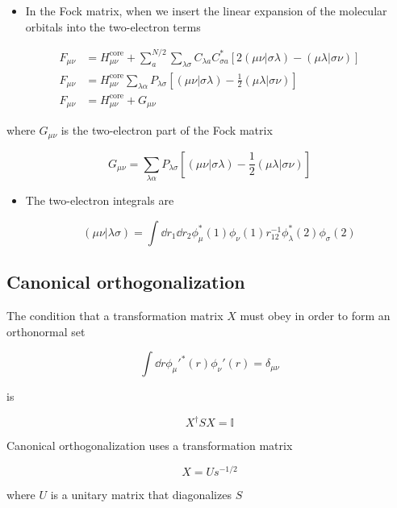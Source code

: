 \documentclass[11pt]{article}
\begin{document}
\begin{itemize}
\item In the Fock matrix, when we insert the linear expansion of the molecular orbitals into the two-electron terms
\end{itemize}


\begin{align*}
    F_{\mu\nu} &= H_{\mu\nu}^{\text{core}} + \sum_a^{N/2}\sum_{\lambda\sigma}C_{\lambda a}C_{\sigma a}^{ * }[2(\mu\nu|\sigma\lambda) - (\mu\lambda|\sigma\nu)] \\
    F_{\mu\nu} &= H_{\mu\nu}^{\text{core}} \sum_{\lambda\alpha} P_{\lambda\sigma}[(\mu\nu|\sigma\lambda) - \frac{1}{2}(\mu\lambda|\sigma\nu)] \\
    F_{\mu\nu} &= H_{\mu\nu}^{\text{core}} + G_{\mu\nu}
\end{align*}

where \(G_{\mu\nu}\) is the two-electron part of the Fock matrix

\begin{equation}
\label{eq:G-mat}
G_{\mu\nu}= \sum_{\lambda\alpha} P_{\lambda\sigma}[(\mu\nu|\sigma\lambda) - \frac{1}{2}(\mu\lambda|\sigma\nu)]
\end{equation}

\begin{itemize}
\item The two-electron integrals are

\[ (\mu\nu|\lambda\sigma) = \int\dd{r_1}\dd{r_2} \phi_{\mu}^{ * }(1)\phi_{\nu}(1)r_{12}^{-1}\phi_{\lambda}^{ * }(2)\phi_{\sigma}(2) \]
\end{itemize}
\subsection{Canonical orthogonalization}
\label{sec:org13207c7}

The condition that a transformation matrix \(X\) must obey in order to form an orthonormal set

\[ \int\dd{r} \phi_{\mu}'^{ * } (r) \phi_{\nu}' (r) = \delta_{\mu\nu}\]

is

\[ X^{\dagger}S X = \mathbb{I} \]

Canonical orthogonalization uses a transformation matrix

\begin{equation}
\label{eq:X-mat}
X = Us^{-1/2}
\end{equation}

where \(U\) is a unitary matrix that diagonalizes \(S\)
\end{document}
